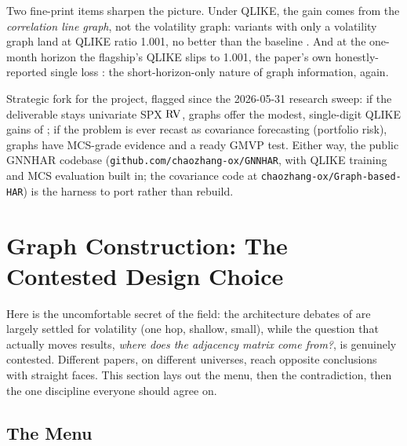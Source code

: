 Two fine-print items sharpen the picture. Under QLIKE, the gain comes from the \emph{correlation line graph}, not the volatility graph: variants with only a volatility graph land at QLIKE ratio 1.001, no better than the baseline \citep[Table~4]{ZhangPuCucuringuDong2024}. And at the one-month horizon the flagship's QLIKE slips to 1.001, the paper's own honestly-reported single loss \citep[Table~6, pp.~20--21]{ZhangPuCucuringuDong2024}: the short-horizon-only nature of graph information, again.

\begin{projectconnection}
Strategic fork for the project, flagged since the 2026-05-31 research sweep: if the deliverable stays univariate SPX $\operatorname{RV}$, graphs offer the modest, single-digit QLIKE gains of ; if the problem is ever recast as covariance forecasting (portfolio risk), graphs have MCS-grade evidence and a ready GMVP test. Either way, the public GNNHAR codebase (\texttt{github.com/chaozhang-ox/GNNHAR}, with QLIKE training and MCS evaluation built in; the covariance code at \texttt{chaozhang-ox/Graph-based-HAR}) is the harness to port rather than rebuild.
\end{projectconnection}

\section{Graph Construction: The Contested Design Choice}\label{sec:gnn:graph-construction}

Here is the uncomfortable secret of the field: the architecture debates of  are largely settled for volatility (one hop, shallow, small), while the question that actually moves results, \emph{where does the adjacency matrix come from?}, is genuinely contested. Different papers, on different universes, reach opposite conclusions with straight faces. This section lays out the menu, then the contradiction, then the one discipline everyone should agree on.

\subsection{The Menu}\label{sec:gnn:graph-menu}

